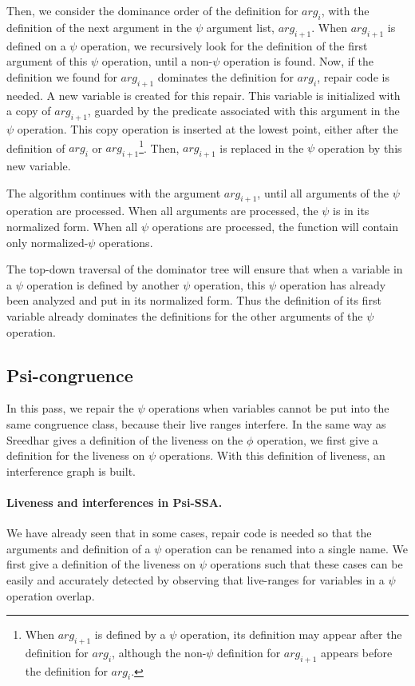 Then, we consider the dominance order of the definition for
$arg_i$, with the definition of the next argument in the $\psi$
argument list, $arg_{i+1}$. When $arg_{i+1}$ is defined on a $\psi$
operation, we recursively look for the definition of the first
argument of this $\psi$ operation, until a non-$\psi$ operation is
found. Now, if the definition we found for $arg_{i+1}$ dominates the
definition for $arg_i$, repair code is needed. A new variable is
created for this repair. This variable is initialized with a copy of
$arg_{i+1}$, guarded by the predicate associated with this argument in
the $\psi$ operation. This copy operation is inserted at the lowest
point, either after the definition of $arg_i$ or $arg_{i+1}
$\footnote{When $arg_{i+1}$ is defined by a $\psi$ operation, its
definition may appear after the definition for $arg_i$, although the
non-$\psi$ definition for $arg_{i+1}$ appears before the definition
for $arg_i$.}. Then, $arg_{i+1}$ is replaced in the $\psi$ operation
by this new variable.

The algorithm continues with the argument $arg_{i+1}$, until all
arguments of the $\psi$ operation are processed. When all arguments
are processed, the $\psi$ is in its normalized form. When all $\psi$
operations are processed, the function will contain only
normalized-$\psi$ operations.

The top-down traversal of the dominator tree will ensure that when a
variable in a $\psi$ operation is defined by another $\psi$ operation,
this $\psi$ operation has already been analyzed and put in its
normalized form. Thus the definition of its first variable already
dominates the definitions for the other arguments of the $\psi$
operation.

\subsection{Psi-congruence}

In this pass, we repair the $\psi$ operations when variables cannot be
put into the same congruence class, because their live ranges
interfere. In the same way as Sreedhar gives a definition of the
liveness on the $\phi$ operation, we first give a definition for the
liveness on $\psi$ operations. With this definition of liveness, an
interference graph is built.

\paragraph{Liveness and interferences in Psi-SSA.}
We have already seen that in some cases, repair code is needed so that
the arguments and definition of a $\psi$ operation can be renamed into
a single name. We first give a definition of the liveness on $\psi$
operations such that these cases can be easily and accurately detected
by observing that live-ranges for variables in a $\psi$ operation
overlap.


